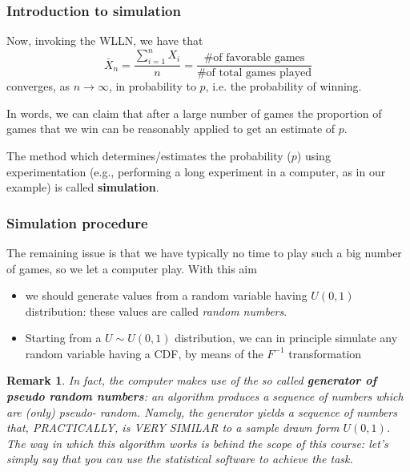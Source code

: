 \documentclass[notes=show,smaller,handout]{beamer}\usepackage[]{graphicx}\usepackage[]{color}
\newtheorem{remark}{Remark}[section]
\begin{document}
\begin{frame}
\frametitle{Introduction to simulation}
Now, invoking the WLLN, we have that
$$
\bar{X}_n = \frac{\sum_{i=1}^n X_i}{n} = \frac{\text{\# of favorable games}}{\text{\# of total games played}}
$$
converges, as $n \to \infty$, in probability to $p$, i.e. the probability of winning. \pause \\

\vspace{0.4cm}

In words, we can claim that after a large number of games the proportion
of games that we win can be reasonably applied to get an estimate of $p$.
\vspace{0.4cm}

\begin{definition}
The method which determines/estimates the probability ($p$) using experimentation (e.g., performing a long experiment in a computer, as in our example) is called \textbf{simulation}.
\end{definition}


\end{frame}



\begin{frame}
\frametitle{Simulation procedure}

The remaining issue is that we have typically no
time to play such a big number of games, so we let a computer play.
With this aim

\begin{itemize}
\item we should generate values from a random  variable
having $U(0,1)$ distribution: these values are called \textit{random numbers}.

\item Starting from a $U \sim U(0,1)$ distribution, we can in principle simulate any random variable having a CDF, by means of the $F^{-1}$ transformation %

\end{itemize}

\begin{remark}
In fact, the computer makes use of the so called \textbf{generator of pseudo random numbers}: an algorithm produces a sequence of numbers which are (only) pseudo-
random. Namely, the generator yields a sequence of numbers that, PRACTICALLY, is VERY SIMILAR to a sample drawn form $U(0,1)$. The way in which this algorithm works is behind the scope of this course: let's simply say that you can use the statistical software to achieve the task.
\end{remark}



\end{frame}
\end{document}
